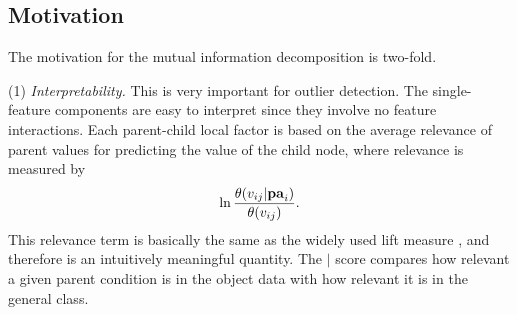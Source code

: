 {%



\subsection{Motivation} 
%
The motivation for the mutual information decomposition is two-fold. 

\noindent
(1) {\em Interpretability.} This is very important for outlier detection. The single-feature components are easy to interpret since they involve no feature interactions. Each parent-child local factor is based on the average relevance of parent values for predicting the value of the child node, where relevance is measured by $$\ln \frac{\theta(v_{ij}|\mathbf{pa}_{i})}{\theta(v_{ij})}.$$ This relevance term  is basically the same as the widely used lift measure \citep{Tuffery2011}, and therefore is an intuitively meaningful quantity. The $\mid$ score compares how relevant a given parent condition is in the object data with how relevant it is in the general class. 

}

